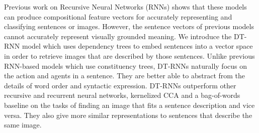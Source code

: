 Previous work on Recursive Neural Networks (RNNs) shows that these models can produce compositional feature vectors for accurately representing and classifying sentences or images. However, the sentence vectors of previous models cannot accurately represent visually grounded meaning. We introduce the DT-RNN model which uses dependency trees to embed sentences into a vector space in order to retrieve images that are described by those sentences. Unlike previous RNN-based models which use constituency trees, DT-RNNs naturally focus on the action and agents in a sentence. They are better able to abstract from the details of word order and syntactic expression. DT-RNNs outperform other recursive and recurrent neural networks, kernelized CCA and a bag-of-words baseline on the tasks of finding an image that fits a sentence description and vice versa. They also give more similar representations to sentences that describe the same image.
